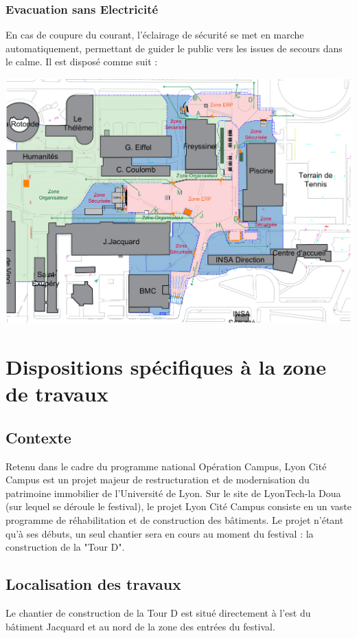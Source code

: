 \documentclass[hidelinks, paper=a4, fontsize=13pt]{report}
\begin{document}
\subsubsection{Evacuation sans Electricité}
En cas de coupure du courant, l’éclairage de sécurité se met en marche automatiquement, permettant de guider le public vers les issues de secours dans le calme. Il est disposé comme suit :
\begin{center}
	\includegraphics[width=.8\textwidth,keepaspectratio]{Exports/Plan_24h_44eme-Blocs_Phares}
\end{center}



\newpage

\section{Dispositions spécifiques à la zone de travaux}

\subsection{Contexte}
Retenu dans le cadre du programme national Opération Campus, Lyon Cité Campus est un projet majeur de restructuration et de modernisation du patrimoine immobilier de l'Université de Lyon. Sur le site de LyonTech-la Doua (sur lequel se déroule le festival), le projet Lyon Cité Campus consiste en un vaste programme de réhabilitation et de construction des bâtiments. Le projet n'étant qu'à ses débuts, un seul chantier sera en cours au moment du festival : la construction de la "Tour D".

\subsection{Localisation des travaux}
Le chantier de construction de la Tour D est situé directement à l'est du bâtiment Jacquard et au nord de la zone des entrées du festival.
\end{document}
